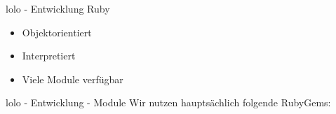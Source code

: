 \begin{frame}{lolo - Entwicklung}
  \Large
  Ruby
  \begin{itemize}
    \item Objektorientiert
    \item Interpretiert
    \item Viele Module verfügbar
  \end{itemize}
\end{frame}

\begin{frame}{lolo - Entwicklung - Module}
  \Large
  Wir nutzen hauptsächlich folgende RubyGems:
\end{frame}